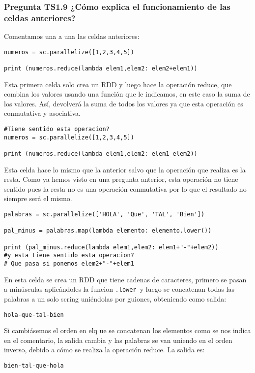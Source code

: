 \documentclass[11pt]{article}
\def\inline{\lstinline[basicstyle=\ttfamily,keywordstyle={}]}
\begin{document}
\subsubsection*{ Pregunta TS1.9 ¿Cómo explica el funcionamiento de las celdas anteriores?}

Comentamos una a una las celdas anteriores:

\begin{verbatim}
numeros = sc.parallelize([1,2,3,4,5])

print (numeros.reduce(lambda elem1,elem2: elem2+elem1))
\end{verbatim}

Esta primera celda solo crea un RDD y luego hace la operación reduce, que combina los valores usando una función que le indicamos, en este caso la suma de los valores. Así, devolverá la suma de todos los valores ya que esta operación es conmutativa y asociativa.


\begin{verbatim}
#Tiene sentido esta operacion?
numeros = sc.parallelize([1,2,3,4,5])

print (numeros.reduce(lambda elem1,elem2: elem1-elem2))
\end{verbatim}

Esta celda hace lo mismo que la anterior salvo que la operación que realiza es la resta. Como ya hemos visto en una pregunta anterior, esta operación no tiene sentido pues la resta no es una operación conmutativa por lo que el resultado no siempre será el mismo.

\begin{verbatim}
palabras = sc.parallelize(['HOLA', 'Que', 'TAL', 'Bien'])

pal_minus = palabras.map(lambda elemento: elemento.lower())

print (pal_minus.reduce(lambda elem1,elem2: elem1+"-"+elem2))
#y esta tiene sentido esta operacion?
# Que pasa si ponemos elem2+"-"+elem1
\end{verbatim}

En esta celda se crea un RDD que tiene cadenas de caracteres, primero se pasan a minúsculas aplicándoles la funcion \inline{.lower }y luego se concatenan todas las palabras a un solo scring uniéndolas por guiones, obteniendo como salida:
\begin{verbatim}
hola-que-tal-bien
\end{verbatim}

Si cambiásemos el orden en elq ue se concatenan los elementos como se nos indica en el comentario, la salida cambia y las palabras se van uniendo en el orden inverso, debido a cómo se realiza la operación reduce. La salida es:
\begin{verbatim}
bien-tal-que-hola
\end{verbatim}
\end{document}
